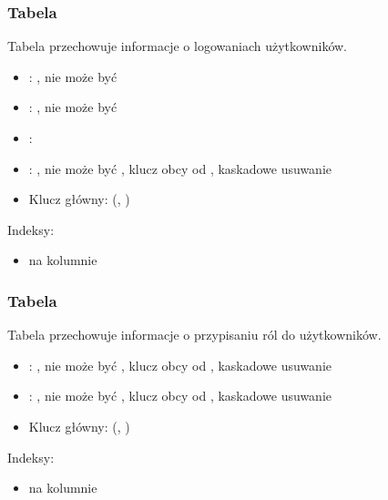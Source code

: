 \subsubsection{Tabela }
Tabela przechowuje informacje o logowaniach użytkowników.
\begin{itemize}
    \item {}: , nie może być 
    \item {}: , nie może być 
    \item {}: 
    \item {}: , nie może być , klucz obcy od , kaskadowe usuwanie
    \item Klucz główny: (, )
\end{itemize}
Indeksy:
\begin{itemize}
    \item {} na kolumnie 
\end{itemize}

\subsubsection{Tabela }
Tabela przechowuje informacje o przypisaniu ról do użytkowników.
\begin{itemize}
    \item {}: , nie może być , klucz obcy od , kaskadowe usuwanie
    \item {}: , nie może być , klucz obcy od , kaskadowe usuwanie
    \item Klucz główny: (, )
\end{itemize}
Indeksy:
\begin{itemize}
    \item {} na kolumnie 
\end{itemize}

